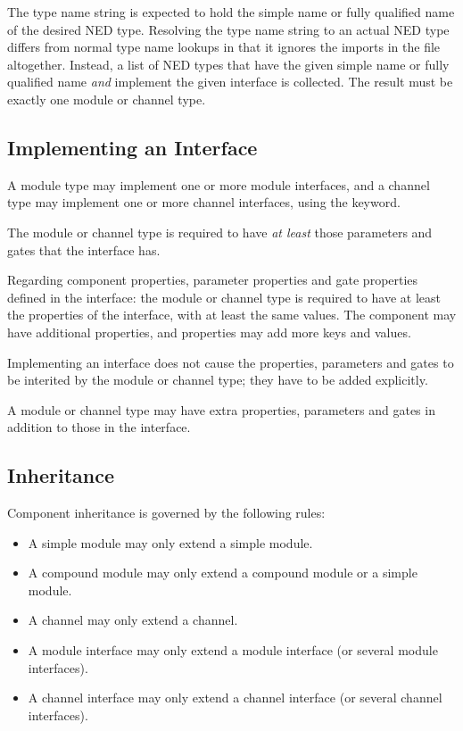 { The type name string is expected to hold the simple name or
fully qualified name of the desired NED type. Resolving the type name
string to an actual NED type differs from normal type name lookups in that
it ignores the imports in the file altogether. Instead, a list of NED types
that have the given simple name or fully qualified name \textit{and}
implement the given interface is collected. The result must be exactly one
module or channel type.


\subsection{Implementing an Interface}
\label{sec:ned-ref:implementing-an-interface}

A module type may implement one or more module interfaces, and a channel type
may implement one or more channel interfaces, using the 
keyword.

The module or channel type is required to have \textit{at least} those
parameters and gates that the interface has.

Regarding component properties, parameter properties and gate properties
defined in the interface: the module or channel type is required to have at
least the properties of the interface, with at least the same values.
The component may have additional properties, and properties may add more
keys and values.

\begin{note}
  Implementing an interface does not cause the properties, parameters and
  gates to be interited by the module or channel type; they have to be added
  explicitly.
\end{note}

\begin{note}
  A module or channel type may have extra properties, parameters and gates
  in addition to those in the interface.
\end{note}



\subsection{Inheritance}
\label{sec:ned-ref:inheritance}

Component inheritance is governed by the following rules:

\begin{itemize}
  \item A simple module may only extend a simple module.
  \item A compound module may only extend a compound module or a simple module.
  \item A channel may only extend a channel.
  \item A module interface may only extend a module interface (or several module
        interfaces).
  \item A channel interface may only extend a channel interface (or several
        channel interfaces).
\end{itemize}

}
